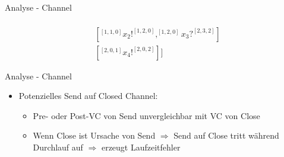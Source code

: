 \documentclass[aspectratio=169]{beamer}  %
\begin{document}
\begin{frame}{Analyse - Channel}
  \begin{minipage}{0.49\textwidth}
    \begin{align*}
      [&[^{[2,0,0]}x_1?^{[3,2,0]}]\\
      &[^{[1, 1, 0]}x_2!^{[1, 2, 0]}, ^{[1, 2, 0]}x_3?^{[2, 3, 2]}]\\
      &[^{[2, 0, 1]}x_4!^{[2, 0, 2]}]]
    \end{align*}
    \end{minipage}
    \hfill
    \hfill
    \begin{minipage}{0.24\textwidth}
    \end{minipage}
    \hfill
    \begin{minipage}{0.24\textwidth}
    \end{minipage}
\end{frame}

\begin{frame}{Analyse - Channel}
  \begin{itemize}
    \item Potenzielles Send auf Closed Channel:
    \begin{itemize}
      \item Pre- oder Post-VC von Send unvergleichbar mit VC von Close
      \item Wenn Close ist Ursache von Send $\Rightarrow$ Send auf Close tritt 
      während Durchlauf auf $\Rightarrow$ erzeugt Laufzeitfehler
    \end{itemize}
  \end{itemize}
\end{frame}
\end{document}
